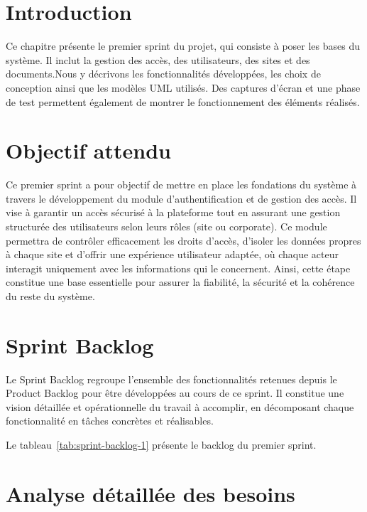 {}

\section{Introduction}
Ce chapitre présente le premier sprint du projet, qui consiste à poser les bases du système. Il inclut la gestion des accès, des utilisateurs, des sites et des documents.Nous y décrivons les fonctionnalités développées, les choix de conception ainsi que les modèles UML utilisés. Des captures d’écran et une phase de test permettent également de montrer le fonctionnement des éléments réalisés.

\section{Objectif attendu}

Ce premier sprint a pour objectif de mettre en place les fondations du système à travers le développement du module d’authentification et de gestion des accès. Il vise à garantir un accès sécurisé à la plateforme tout en assurant une gestion structurée des utilisateurs selon leurs rôles (site ou corporate). Ce module permettra de contrôler efficacement les droits d’accès, d’isoler les données propres à chaque site et d’offrir une expérience utilisateur adaptée, où chaque acteur interagit uniquement avec les informations qui le concernent. Ainsi, cette étape constitue une base essentielle pour assurer la fiabilité, la sécurité et la cohérence du reste du système.

\section{Sprint Backlog}

Le Sprint Backlog regroupe l'ensemble des fonctionnalités retenues depuis le Product Backlog pour être développées au cours de ce sprint. Il constitue une vision détaillée et opérationnelle du travail à accomplir, en décomposant chaque fonctionnalité en tâches concrètes et réalisables.

Le tableau~\ref{tab:sprint-backlog-1} présente le backlog du premier sprint.



\section{Analyse détaillée des besoins}

